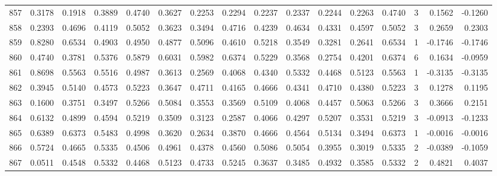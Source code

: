 \begin{tabular}{lrrrrrrrrrrrrrrr}
857 &      0.3178 &  0.1918 &  0.3889 &  0.4740 &  0.3627 &  0.2253 &  0.2294 &  0.2237 &  0.2337 &  0.2244 &   0.2263 &     0.4740 &      3 &                    0.1562 &                    -0.1260 \\
858 &      0.2393 &  0.4696 &  0.4119 &  0.5052 &  0.3623 &  0.3494 &  0.4716 &  0.4239 &  0.4634 &  0.4331 &   0.4597 &     0.5052 &      3 &                    0.2659 &                     0.2303 \\
859 &      0.8280 &  0.6534 &  0.4903 &  0.4950 &  0.4877 &  0.5096 &  0.4610 &  0.5218 &  0.3549 &  0.3281 &   0.2641 &     0.6534 &      1 &                   -0.1746 &                    -0.1746 \\
860 &      0.4740 &  0.3781 &  0.5376 &  0.5879 &  0.6031 &  0.5982 &  0.6374 &  0.5229 &  0.3568 &  0.2754 &   0.4201 &     0.6374 &      6 &                    0.1634 &                    -0.0959 \\
861 &      0.8698 &  0.5563 &  0.5516 &  0.4987 &  0.3613 &  0.2569 &  0.4068 &  0.4340 &  0.5332 &  0.4468 &   0.5123 &     0.5563 &      1 &                   -0.3135 &                    -0.3135 \\
862 &      0.3945 &  0.5140 &  0.4573 &  0.5223 &  0.3647 &  0.4711 &  0.4165 &  0.4666 &  0.4341 &  0.4710 &   0.4380 &     0.5223 &      3 &                    0.1278 &                     0.1195 \\
863 &      0.1600 &  0.3751 &  0.3497 &  0.5266 &  0.5084 &  0.3553 &  0.3569 &  0.5109 &  0.4068 &  0.4457 &   0.5063 &     0.5266 &      3 &                    0.3666 &                     0.2151 \\
864 &      0.6132 &  0.4899 &  0.4594 &  0.5219 &  0.3509 &  0.3123 &  0.2587 &  0.4066 &  0.4297 &  0.5207 &   0.3531 &     0.5219 &      3 &                   -0.0913 &                    -0.1233 \\
865 &      0.6389 &  0.6373 &  0.5483 &  0.4998 &  0.3620 &  0.2634 &  0.3870 &  0.4666 &  0.4564 &  0.5134 &   0.3494 &     0.6373 &      1 &                   -0.0016 &                    -0.0016 \\
866 &      0.5724 &  0.4665 &  0.5335 &  0.4506 &  0.4961 &  0.4378 &  0.4560 &  0.5086 &  0.5054 &  0.3955 &   0.3019 &     0.5335 &      2 &                   -0.0389 &                    -0.1059 \\
867 &      0.0511 &  0.4548 &  0.5332 &  0.4468 &  0.5123 &  0.4733 &  0.5245 &  0.3637 &  0.3485 &  0.4932 &   0.3585 &     0.5332 &      2 &                    0.4821 &                     0.4037 \\

\end{tabular}
